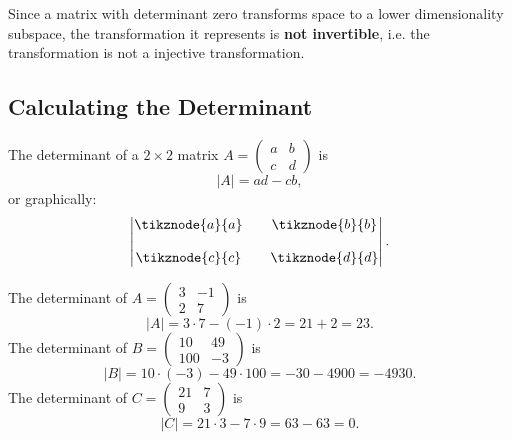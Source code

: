 Since a matrix with determinant zero transforms space to a lower dimensionality subspace, the transformation it represents is \textbf{not invertible}, i.e. the transformation is not a injective transformation.

\subsection{Calculating the Determinant}
The determinant of a $2\times2$ matrix $A=\begin{pmatrix}a & b \\ c & d \end{pmatrix}$ is
\begin{equation*}
  |A| = ad - cb,
\end{equation*}
or graphically:
\begin{equation*}
  \begin{vmatrix} \tikznode{a}{a} & & \tikznode{b}{b} \\ & & \\\tikznode{c}{c} & & \tikznode{d}{d} \end{vmatrix}.
\end{equation*}

\begin{example}
  The determinant of $A=\begin{pmatrix} 3 & -1\\ 2 & 7 \end{pmatrix}$ is
  \begin{equation*}
	|A| = 3\cdot7 - (-1)\cdot2 = 21 + 2 = 23.
  \end{equation*}
  The determinant of $B=\begin{pmatrix} 10 & 49\\ 100 & -3 \end{pmatrix}$ is
  \begin{equation*}
	|B| = 10\cdot(-3) - 49\cdot100 = -30 - 4900 = -4930.
  \end{equation*}
  The determinant of $C=\begin{pmatrix} 21 & 7\\ 9 & 3 \end{pmatrix}$ is
  \begin{equation*}
	|C| = 21\cdot3 - 7\cdot9 = 63 - 63 = 0.
  \end{equation*}
\end{example}

